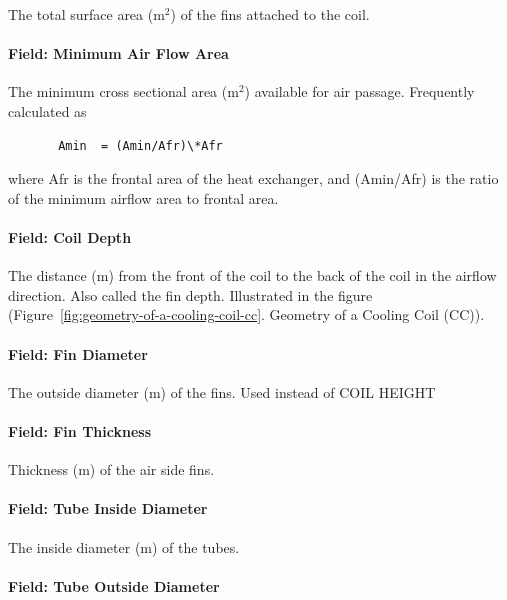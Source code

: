 The total surface area (m\(^{2}\)) of the fins attached to the coil.

\paragraph{Field: Minimum Air Flow Area}\label{field-minimum-air-flow-area}

The minimum cross sectional area (m\(^{2}\)) available for air passage. Frequently calculated as

\begin{lstlisting}
       Amin  = (Amin/Afr)\*Afr
\end{lstlisting}

where Afr is the frontal area of the heat exchanger, and (Amin/Afr) is the ratio of the minimum airflow area to frontal area.

\paragraph{Field: Coil Depth}\label{field-coil-depth}

The distance (m) from the front of the coil to the back of the coil in the airflow direction. Also called the fin depth. Illustrated in the figure (Figure~\ref{fig:geometry-of-a-cooling-coil-cc}. Geometry of a Cooling Coil (CC)).

\paragraph{Field: Fin Diameter}\label{field-fin-diameter}

The outside diameter (m) of the fins. Used instead of COIL HEIGHT

\paragraph{Field: Fin Thickness}\label{field-fin-thickness}

Thickness (m) of the air side fins.

\paragraph{Field: Tube Inside Diameter}\label{field-tube-inside-diameter}

The inside diameter (m) of the tubes.

\paragraph{Field: Tube Outside Diameter}\label{field-tube-outside-diameter}

